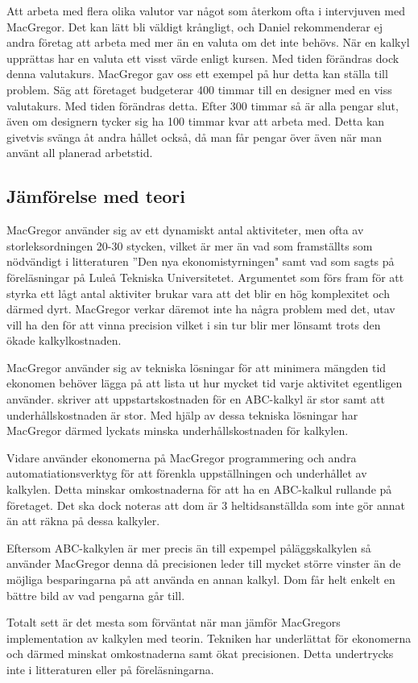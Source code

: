 Att arbeta med flera olika valutor var något som återkom ofta i intervjuven med MacGregor.
Det kan lätt bli väldigt krångligt, och Daniel rekommenderar ej andra företag att arbeta med mer än en valuta om det inte behövs.
När en kalkyl upprättas har en valuta ett visst värde enligt kursen.
Med tiden förändras dock denna valutakurs.
MacGregor gav oss ett exempel på hur detta kan ställa till problem.
Säg att företaget budgeterar 400 timmar till en designer med en viss valutakurs.
Med tiden förändras detta.
Efter 300 timmar så är alla pengar slut, även om designern tycker sig ha 100 timmar kvar att arbeta med.
Detta kan givetvis svänga åt andra hållet också, då man får pengar över även när man använt all planerad arbetstid.

%
%

\subsection{Jämförelse med teori}

MacGregor använder sig av ett dynamiskt antal aktiviteter, men ofta av storleksordningen 20-30 stycken, vilket är mer än vad som framställts som nödvändigt i litteraturen ''Den nya ekonomistyrningen" \cite{dne} samt vad som sagts på föreläsningar på Luleå Tekniska Universitetet.
Argumentet som förs fram för att styrka ett lågt antal aktiviter brukar vara att det blir en hög komplexitet och därmed dyrt.
MacGregor verkar däremot inte ha några problem med det, utav vill ha den för att vinna precision vilket i sin tur blir mer lönsamt trots den ökade kalkylkostnaden.

MacGregor använder sig av tekniska lösningar för att minimera mängden tid ekonomen behöver lägga på att lista ut hur mycket tid varje aktivitet egentligen använder.
\cite{dne} skriver att uppstartskostnaden för en ABC-kalkyl är stor samt att underhållskostnaden är stor.
Med hjälp av dessa tekniska lösningar har MacGregor därmed lyckats minska underhållskostnaden för kalkylen.

Vidare använder ekonomerna på MacGregor programmering och andra automatiationsverktyg för att förenkla uppställningen och underhållet av kalkylen.
Detta minskar omkostnaderna för att ha en ABC-kalkul rullande på företaget.
Det ska dock noteras att dom är 3 heltidsanställda som inte gör annat än att räkna på dessa kalkyler.

Eftersom ABC-kalkylen är mer precis än till expempel påläggskalkylen så använder MacGregor denna då precisionen leder till mycket större vinster än de möjliga besparingarna på att använda en annan kalkyl.
Dom får helt enkelt en bättre bild av vad pengarna går till.

Totalt sett är det mesta som förväntat när man jämför MacGregors implementation av kalkylen med teorin.
Tekniken har underlättat för ekonomerna och därmed minskat omkostnaderna samt ökat precisionen.
Detta undertrycks inte i litteraturen eller på föreläsningarna.